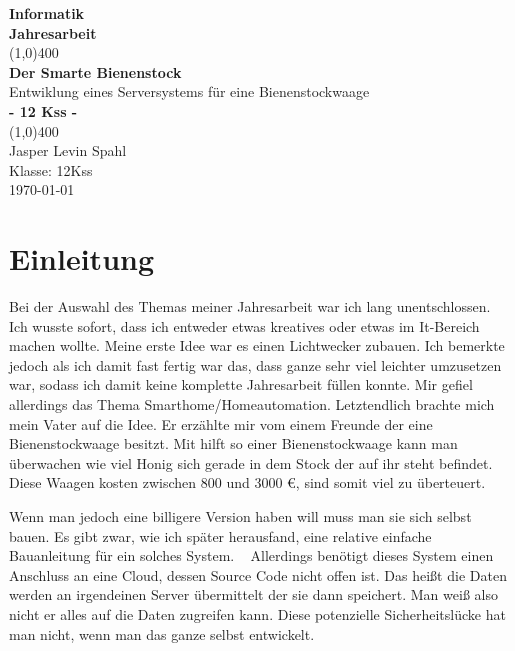 \documentclass[a4paper, ngerman, 12pt]{scrartcl}
\author{Jasper Levin Spahl}
\begin{document}
\begin{titlepage}
\begin{center}
\vspace*{1cm}

\Large{\textbf{Informatik}}\\
\Large{\textbf{Jahresarbeit}}\\
\vfill
\line(1,0){400}\\[1mm]
\huge{\textbf{Der Smarte Bienenstock}}\\[3mm]
\large{Entwiklung eines Serversystems für eine Bienenstockwaage}\\[3mm]
\Large{\textbf{- 12 Kss -}}\\
\line(1,0){400}\\
\vfill
Jasper Levin Spahl\\
Klasse: 12Kss\\
\today\\
\end{center}
\end{titlepage}

\tableofcontents
\thispagestyle{empty}
\clearpage
\setcounter{page}{1}

\section{Einleitung}

Bei der Auswahl des Themas meiner Jahresarbeit war ich lang unentschlossen.
Ich wusste sofort, dass ich entweder etwas kreatives oder etwas im It-Bereich machen wollte.
Meine erste Idee war es einen Lichtwecker zubauen.
Ich bemerkte jedoch als ich damit fast fertig war das, dass ganze sehr viel leichter umzusetzen war, sodass ich damit keine komplette Jahresarbeit füllen konnte.
Mir gefiel allerdings das Thema Smarthome/Homeautomation.
Letztendlich brachte mich mein Vater auf die Idee.
Er erzählte mir vom einem Freunde der eine Bienenstockwaage besitzt.
Mit hilft so einer Bienenstockwaage kann man überwachen wie viel Honig sich gerade in dem Stock der auf ihr steht befindet.
Diese Waagen kosten zwischen 800 und 3000 \euro{}, sind somit viel zu überteuert.

Wenn man jedoch eine billigere Version haben will muss man sie sich selbst bauen.
Es gibt zwar, wie ich später herausfand, eine relative einfache Bauanleitung für ein solches System.
~\cite{Honeypi}
Allerdings benötigt dieses System einen Anschluss an eine Cloud, dessen Source Code nicht offen ist.
Das heißt die Daten werden an irgendeinen Server übermittelt der sie dann speichert.
Man weiß also nicht er alles auf die Daten zugreifen kann.
Diese potenzielle Sicherheitslücke hat man nicht, wenn man das ganze selbst entwickelt.
\end{document}
